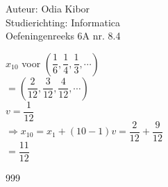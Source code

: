 \documentclass[a4paper]{article}
\begin{document}
  
\noindent \large Auteur: Odia Kibor \\
\noindent \large Studierichting: Informatica\\
\noindent \large Oefeningenreeks 6A nr. 8.4
\\

\medskip

\normalsize


$x_{10}$ voor $\left(\dfrac{1}{6}, \dfrac{1}{4}, \dfrac{1}{3},\cdots\right)$\\

$= \left(\dfrac{2}{12}, \dfrac{3}{12}, \dfrac{4}{12},\cdots\right)$\\

$v = \dfrac{1}{12}$\\

$\Rightarrow x_{10} = x_1 + (10 - 1)v = \dfrac{2}{12} + \dfrac{9}{12}$\\

$= \dfrac{11}{12}$\\




















\begin{thebibliography}{999}
\end{thebibliography}
\end{document}
